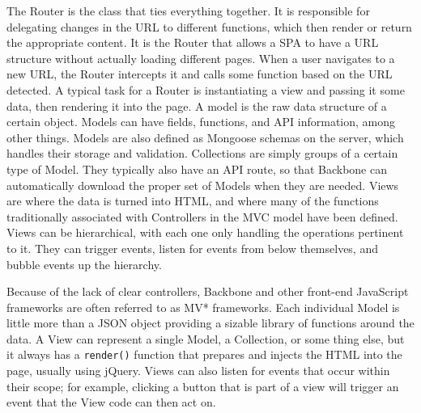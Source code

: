 \documentclass[12pt]{article}
\newcommand{\code}[1]{{\texttt {#1}}}
\begin{document}
The Router is the class that ties everything together. It is responsible for delegating changes in the URL to different functions, which then render or return the appropriate content. 
 It is the Router that allows a SPA to have a URL structure without actually loading different pages. When a user navigates to a new URL, the Router intercepts it and calls some function based on the URL detected. A typical task for a Router is instantiating a view and passing it some data, then rendering it into the page. A model is the raw data structure of a certain object. Models can have fields, functions, and API information, among other things.  Models are also defined as Mongoose schemas on the server, which handles their storage and validation. Collections are simply groups of a certain type of Model. They typically also have an API route, so that Backbone can automatically download the proper set of Models when they are needed. Views are where the data is turned into HTML, and where many of the functions traditionally associated with Controllers in the MVC model have been defined. Views can be hierarchical, with each one only handling the operations pertinent to it. They can trigger events, listen for events from below themselves, and bubble events up the hierarchy. 

Because of the lack of clear controllers, Backbone and other front-end JavaScript frameworks are often referred to as MV* frameworks. Each individual Model is little more than a JSON object providing a sizable library of functions around the data. A View can represent a single Model, a Collection, or some thing else, but it always has a \code{render()} function that prepares and injects the HTML into the page, usually using jQuery. Views can also listen for events that occur within their scope; for example, clicking a button that is part of a view will trigger an event that the View code can then act on. 
\end{document}
